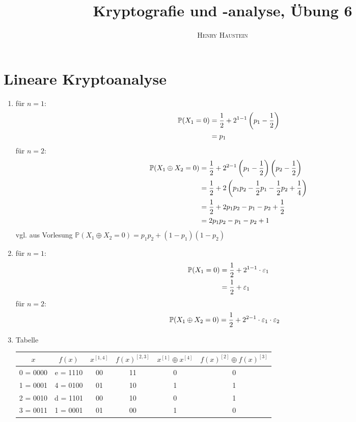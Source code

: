 \documentclass{article}
\title{\textbf{Kryptografie und -analyse, Übung 6}}
\author{\textsc{Henry Haustein}}
\date{}
\begin{document}
	\maketitle

	\section*{Lineare Kryptoanalyse}
	\begin{enumerate}[label=(\alph*)]
		\item für $n=1$:
		\begin{align}
			\mathbb{P}(X_1 = 0) &= \frac{1}{2} + 2^{1-1}\left(p_1 - \frac{1}{2}\right) \notag \\
			&= p_1 \notag
		\end{align}
		für $n=2$:
		\begin{align}
			\mathbb{P}(X_1\oplus X_2 = 0) &= \frac{1}{2} + 2^{2-1}\left(p_1 - \frac{1}{2}\right)\left(p_2 - \frac{1}{2}\right) \notag \\
			&= \frac{1}{2} + 2\left(p_1p_2  - \frac{1}{2}p_1 - \frac{1}{2}p_2 + \frac{1}{4}\right) \notag \\
			&= \frac{1}{2} + 2p_1p_2 - p_1 - p_2 + \frac{1}{2} \notag \\
			&= 2p_1p_2 - p_1 - p_2 + 1 \notag
		\end{align}
		vgl. aus Vorlesung $\mathbb{P}(X_1\oplus X_2=0) = p_1p_2 + (1-p_1)(1-p_2)$
		\item für $n=1$:
		\begin{align}
			\mathbb{P}(X_1 = 0) &= \frac{1}{2} + 2^{1-1}\cdot\varepsilon_1 \notag \\
			&= \frac{1}{2} + \varepsilon_1 \notag
		\end{align}
		für $n=2$:
		\begin{align}
			\mathbb{P}(X_1\oplus X_2 = 0) &= \frac{1}{2} + 2^{2-1}\cdot\varepsilon_1\cdot\varepsilon_2 \notag
		\end{align}
		\item Tabelle
		\begin{center}
			\begin{longtable}{c|c|c|c|c|c}
				$x$ & $f(x)$ & $x^{[1,4]}$ & $f(x)^{[2,3]}$ & $x^{[1]} \oplus x^{[4]}$ & $f(x)^{[2]} \oplus f(x)^{[3]}$ \\
				\hline
				0 = 0000 & e = 1110 & 00 & 11 & 0 & 0 \\
				1 = 0001 & 4 = 0100 & 01 & 10 & 1 & 1 \\
				2 = 0010 & d = 1101 & 00 & 10 & 0 & 1 \\
				3 = 0011 & 1 = 0001 & 01 & 00 & 1 & 0 \\

\end{longtable}
\end{center}
\end{enumerate}
\end{document}
